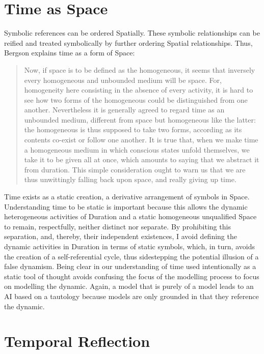 \section{Time as Space}

Symbolic references can be ordered Spatially.  These symbolic
relationships can be reified and treated symbolically by further
ordering Spatial relationships.  Thus, Bergson explains time as a form
of Space:

\begin{quote}
Now, if space is to be defined as the homogeneous, it seems that
inversely every homogeneous and unbounded medium will be space.  For,
homogeneity here consisting in the absence of every activity, it is
hard to see how two forms of the homogeneous could be distinguished
from one another.  Nevertheless it is generally agreed to regard time
as an unbounded medium, different from space but homogeneous like the
latter: the homogeneous is thus supposed to take two forms, according
as its contents co-exist or follow one another.  It is true that, when
we make time a homogeneous medium in which conscious states unfold
themselves, we take it to be given all at once, which amounts to
saying that we abstract it from duration.  This simple consideration
ought to warn us that we are thus unwittingly falling back upon space,
and really giving up time.
\end{quote}

Time exists as a static creation, a derivative arrangement of symbols
in Space.  Understanding time to be static is important because this
allows the dynamic heterogeneous activities of Duration and a static
homogeneous unqualified Space to remain, respectfully, neither
distinct nor separate.  By prohibiting this separation, and, thereby,
their independent existences, I avoid defining the dynamic activities
in Duration in terms of static symbols, which, in turn, avoids the
creation of a self-referential cycle, thus sidestepping the potential
illusion of a false dynamism.  Being clear in our understanding of
time used intentionally as a static tool of thought avoids confusing
the focus of the modelling process to focus on modelling the dynamic.
Again, a model that is purely of a model leads to an AI based on a
tautology because models are only grounded in that they reference the
dynamic.

\section{Temporal Reflection}

